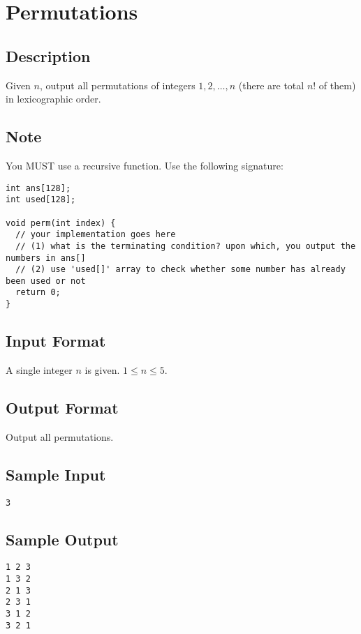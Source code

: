 \newpage

\section{Permutations}

\subsection*{Description}
Given $n$, output all permutations of integers $1, 2, \dots, n$ (there are total $n!$ of them) in lexicographic order. 

\subsection*{Note}
You MUST use a recursive function. Use the following signature:
\begin{verbatim}
int ans[128];
int used[128];

void perm(int index) {
  // your implementation goes here
  // (1) what is the terminating condition? upon which, you output the numbers in ans[]
  // (2) use 'used[]' array to check whether some number has already been used or not
  return 0;
}
\end{verbatim}

\subsection*{Input Format}
A single integer $n$ is given. $1 \leq n \leq 5$. 

\subsection*{Output Format}
Output all permutations.

\subsection*{Sample Input}
\begin{verbatim}
3
\end{verbatim}

\subsection*{Sample Output}
\begin{verbatim}
1 2 3
1 3 2
2 1 3
2 3 1
3 1 2
3 2 1
\end{verbatim}


\newpage


